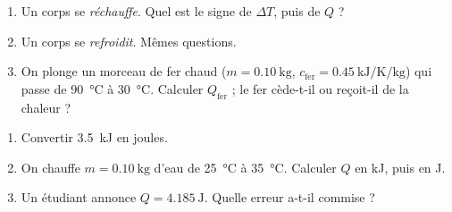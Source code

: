 \documentclass[11pt,a4paper]{article}
\begin{document}
\begin{exercice}
\begin{enumerate}[label=\alph*),leftmargin=2em,topsep=2pt,itemsep=2pt]
  \item Un corps se \emph{réchauffe}. Quel est le signe de $\Delta T$, puis de $Q$ ?
  \item Un corps se \emph{refroidit}. Mêmes questions.
  \item On plonge un morceau de fer chaud ($m=\SI{0.10}{\kilogram}$, $c_{\text{fer}}=\SI{0.45}{\kilo\joule\per\kelvin\per\kilogram}$)
        qui passe de \SI{90}{\celsius} à \SI{30}{\celsius}. Calculer $Q_{\text{fer}}$ ; le fer cède-t-il ou reçoit-il de la chaleur ?
\end{enumerate}
\end{exercice}

\begin{exercice}
\begin{enumerate}[label=\alph*),leftmargin=2em,topsep=2pt,itemsep=2pt]
  \item Convertir \SI{3.5}{\kilo\joule} en joules.
  \item On chauffe $m=\SI{0.10}{\kilogram}$ d'eau de \SI{25}{\celsius} à \SI{35}{\celsius}. Calculer $Q$ en
        \si{\kilo\joule}, puis en \si{\joule}.
  \item Un étudiant annonce $Q=\SI{4.185}{\joule}$. Quelle erreur a-t-il commise ?
\end{enumerate}
\end{exercice}
\end{document}
